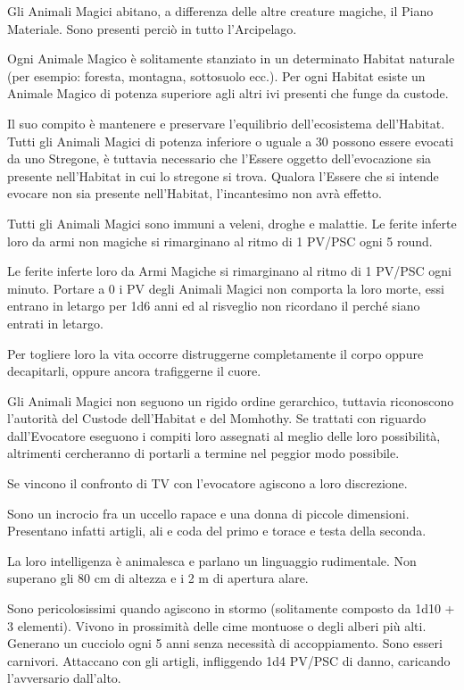 Gli Animali Magici abitano, a differenza delle altre creature magiche,
il Piano Materiale. Sono presenti perci\`o in tutto l'Arcipelago.

Ogni Animale Magico \`e solitamente stanziato in un determinato
Habitat naturale (per esempio: foresta, montagna, sottosuolo ecc.).
Per ogni Habitat esiste un Animale Magico di potenza superiore agli
altri ivi presenti che funge da custode.

Il suo compito \`e mantenere e preservare
l'equilibrio dell'ecosistema dell'Habitat. Tutti gli Animali Magici di potenza
inferiore o uguale a 30 possono essere evocati da uno Stregone, \`e tuttavia
necessario che l'Essere oggetto dell'evocazione sia presente nell'Habitat in
cui lo stregone si trova. Qualora l'Essere che si intende evocare non sia presente
nell'Habitat, l'incantesimo non avr\`a effetto. 

Tutti gli Animali Magici sono immuni a veleni, droghe e malattie. Le
ferite inferte loro da armi non magiche si rimarginano al ritmo di 1
PV/PSC ogni 5 round.

Le ferite inferte loro da Armi Magiche si rimarginano al ritmo di 1
PV/PSC ogni minuto. Portare a 0 i PV degli Animali Magici non comporta
la loro morte, essi entrano in letargo per 1d6 anni ed al risveglio
non ricordano il perch\'e siano entrati in letargo.

Per togliere loro la vita occorre distruggerne completamente il corpo
oppure decapitarli, oppure ancora trafiggerne il cuore.

Gli Animali Magici non seguono un rigido ordine gerarchico, tuttavia
riconoscono l'autorit\`a del Custode dell'Habitat e del Momhothy. Se
trattati con riguardo dall'Evocatore eseguono i compiti loro assegnati
al meglio delle loro possibilit\`a, altrimenti cercheranno di
portarli a termine nel peggior modo possibile.

Se vincono il confronto di TV con l'evocatore
agiscono a loro discrezione.



Sono un incrocio fra un uccello rapace e una donna di piccole
dimensioni. Presentano infatti artigli, ali e coda del primo e torace
e testa della seconda.

La loro intelligenza \`e animalesca e parlano un linguaggio
rudimentale. Non superano gli 80 cm di altezza e i 2 m di apertura
alare.

Sono pericolosissimi quando agiscono in stormo (solitamente composto
da 1d10 + 3 elementi). Vivono in prossimit\`a delle cime montuose o
degli alberi pi\`u alti. Generano un cucciolo ogni 5 anni senza
necessit\`a di accoppiamento.  Sono esseri carnivori. Attaccano con
gli artigli, infliggendo 1d4 PV/PSC di danno, caricando l'avversario
dall'alto.

